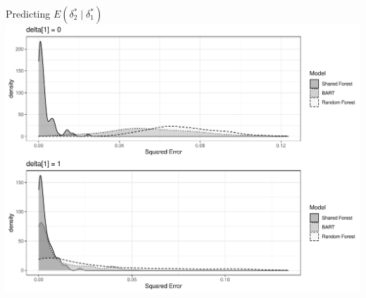\documentclass{beamer}
\begin{document}
\begin{frame}{Predicting $E(\delta_2^* \mid \delta_1^*)$ }
\includegraphics[width = .9\linewidth]{binary_sim_results.pdf}
\end{frame}
\end{document}
